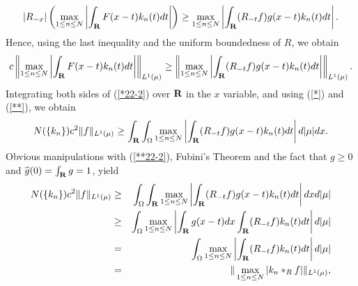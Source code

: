 $$
|R_{-x}|
\left(
\max_{1\leq n\leq N}
\left|
\int_\R F(x-t)k_n(t) dt
\right|
\right)			
\geq
\max_{1\leq n\leq N}
\left|
\int_\R
(R_{-t} f) g(x-t) k_n(t) dt
\right|.
$$
Hence, using the last inequality
and the uniform boundedness of $R$,
we obtain
\begin{equation}
c\left\|
\max_{1\leq n\leq N}
\left|
\int_\R F(x-t)k_n(t) dt
\right|
\right\|_{L^1(\mu)}
	\geq
\left\|
\max_{1\leq n\leq N}
\left|
\int_\R
(R_{-t} f) g(x-t) k_n(t) dt
\right|
\right\|_{L^1(\mu)}.
\label{*22-2}
\end{equation}
Integrating both sides of (\ref{*22-2})
over $\R$ in the $x$ variable,
and using (\ref{*}) and (\ref{**}), 
we obtain
\begin{equation}
N(\{k_n\}) c^2 \|f\|_{L^1(\mu)}\geq
 \int_\R \int_\O
\max_{1\leq n\leq N}
\left|
\int_\R
(R_{-t} f) g(x-t) k_n(t) dt
\right|
d|\mu|dx .
\label{**22-2}
\end{equation}
Obvious manipulations with 
(\ref{**22-2}),
 Fubini's Theorem and 
the fact that $g\geq 0$ and $\widehat{g}(0)=\int_\R g =1$,
 yield
\begin{eqnarray*}
N(\{k_n\}) c^2 \|f\|_{L^1(\mu)}
			&\geq&
 \int_\O \int_\R
\max_{1\leq n\leq N}
\left|
\int_\R
(R_{-t} f) g(x-t) k_n(t) dt
\right|
dx d|\mu| \\
			&\geq&
 \int_\O 
\max_{1\leq n\leq N}
\left| \int_\R g(x-t)dx
\int_\R
(R_{-t} f) k_n(t) dt
\right|
d|\mu | \\
			&=&
 \int_\O 
\max_{1\leq n\leq N}
\left| 
\int_\R
(R_{-t} f) k_n(t) dt
\right|
d|\mu| \\
			&=&
\|\max_{1\leq n\leq N} |k_n*_Rf|\|_{L^1(\mu)},
\end{eqnarray*}
